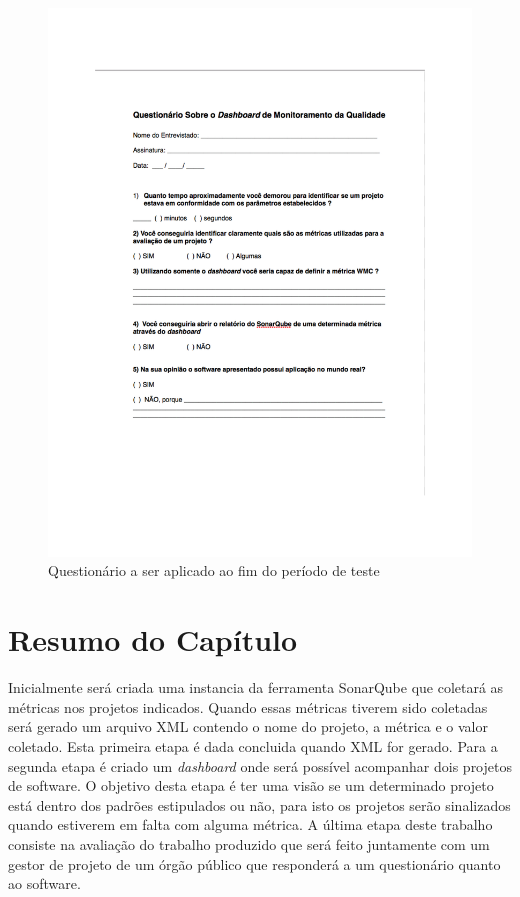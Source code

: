 \graphicspath{{figuras/}}
\begin{figure}[h]
\centering
\includegraphics[scale=1.00]{questionario}
\caption{Questionário a ser aplicado ao fim do período de teste}
\label{img:questionario}
\end{figure}

\section{Resumo do Capítulo}
Inicialmente será criada uma instancia da ferramenta SonarQube que coletará as métricas nos projetos indicados. Quando essas métricas tiverem sido coletadas será gerado um arquivo XML contendo o nome do projeto, a métrica e o valor coletado. Esta primeira etapa é dada concluida quando XML for gerado. Para a segunda etapa é criado um \textit{dashboard} onde será possível acompanhar dois projetos de software. O objetivo desta etapa é ter uma visão se um determinado projeto está dentro dos padrões estipulados ou não, para isto os projetos serão sinalizados quando estiverem em falta com alguma métrica. A última etapa deste trabalho consiste na avaliação do trabalho produzido que será feito juntamente com um gestor de projeto de um órgão público que responderá a um questionário quanto ao software.